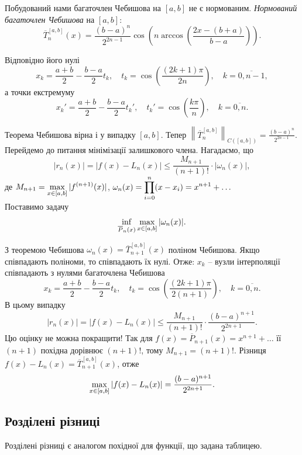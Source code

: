 Побудований нами багаточлен Чебишова на $[a,b]$ не є нормованим. \textit{Нормований багаточлен Чебишова} на $[a,b]$:
\[ \overline{T}_n^{[a,b]}(x) = \dfrac{(b-a)^n}{2^{2n-1}}\cos\left(n\arccos\left(\dfrac{2x-(b+a)}{b-a}\right)\right). \]

Відповідно його нулі
\[x_k = \dfrac{a+b}{2} - \dfrac{b-a}{2}t_k, \quad t_k = \cos\left(\frac{(2k+1)\pi}{2n}\right), \quad k=\overline{0,n-1},\]
а точки екстремуму
\[ x_k' = \dfrac{a+b}{2} - \dfrac{b-a}{2}t_k', \quad t_k' = \cos\left(\frac{k\pi}{n}\right), \quad k=\overline{0,n}.\]

Теорема Чебишова вірна і у випадку $[a,b]$. Тепер $\left\|\overline{T}_n^{[a,b]}\right\|_{C([a,b])} = \frac{(b-a)^n}{2^{2n-1}}$. \\

Перейдемо до питання мінімізації залишкового члена. Нагадаємо, що
\begin{equation}
    \label{eq:6.13}
    |r_n(x)| = |f(x) - L_n(x)| \le \dfrac{M_{n+1}}{(n+1)!}\cdot|\omega_n(x)|,
\end{equation}
де $M_{n+1} = \displaystyle\max\limits_{x\in[a,b]} |f^{(n+1)}(x)|$, $\omega_n(x)=\displaystyle\prod\limits_{i=0}^n (x-x_i)=x^{n+1} + \ldots$\\

Поставимо задачу
\[ \displaystyle\inf\limits_{\overline{P}_n(x)} \displaystyle\max\limits_{x\in[a,b]} |\omega_n(x)|. \]

З теоремою Чебишова $\omega_n(x) = \overline{T}_{n+1}^{[a,b]}(x)$ поліном Чебишова. Якщо співпадають поліноми, то співпадають їх нулі. Отже: $x_k$ -- вузли інтерполяції співпадають з нулями багаточлена Чебишова 
\[x_k = \dfrac{a+b}{2} - \dfrac{b-a}{2}t_k,\quad t_k = \cos\left(\frac{(2k+1)\pi}{2(n+1)}\right),\quad k=\overline{0,n}.\]
В цьому випадку
\begin{equation}
    \label{eq:6.14}
    |r_n(x)| = |f(x)-L_n(x)| \le \dfrac{M_{n+1}}{(n+1)!} \cdot \dfrac{(b-a)^{n+1}}{2^{2n+1}}.
\end{equation}
Цю оцінку не можна покращити! Так для $f(x) = \overline{P}_{n+1}(x) = x^{n+1} + \ldots $ її $(n+1)$ похідна дорівнює $(n+1)!$, тому $M_{n+1} = (n+1)!$. Різниця $f(x) - L_n(x) = \overline{T}_{n+1}^{[a,b]}(x)$, отже \[\displaystyle\max\limits_{x\in[a,b]} |f(x) - L_n(x)| = \dfrac{(b-a)^{n+1}}{2^{2n+1}}.\]

\subsection{Розділені різниці}

Розділені різниці є аналогом похідної для функції, що задана таблицею. \\

